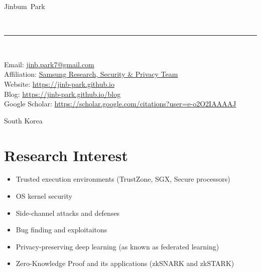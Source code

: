 \documentclass[10pt, a4paper]{article}
\makeatletter
\newcommand{\FirstName}{Jinbum}
\newcommand{\LastName}{Park}
\newcommand{\MyName}{\FirstName\ \LastName}
\newcommand{\Email}{jinb.park7@gmail.com}
\newcommand{\PersonalWebsite}{https://jinb-park.github.io}
\newcommand{\Address}{
  South Korea
}
\newcommand{\Website}[1]{\href{https://#1}{#1}}
\makeatother
\begin{document}
\thispagestyle{empty}

\begin{minipage}[t]{0.7\textwidth}
{\fontsize{22pt}{0}\selectfont\MyName}
\end{minipage}
\\[-0.1cm]
\rule{\textwidth}{2pt}
\\[0.1cm]
\begin{minipage}[t]{0.7\textwidth}
    Email: \href{mailto:\Email}{\Email}
    \\
    Affiliation: \href{https://research.samsung.com/security_privacy}{Samsung Research, Security \& Privacy Team}
    \\
    Website: \Website{\PersonalWebsite}
    \\
    Blog: \Website{https://jinb-park.github.io/blog}
    \\
    Google Scholar: \href{https://scholar.google.com/citations?user=e-o2O2IAAAAJ}{https://scholar.google.com/citations?user=e-o2O2IAAAAJ}
\end{minipage}
\begin{minipage}[t]{0.3\textwidth}
  \begin{flushright}
    \Address
  \end{flushright}
\end{minipage}

\section{Research Interest}

\begin{itemize}
  \item Trusted execution environments (TrustZone, SGX, Secure processors)
  \item OS kernel security
  \item Side-channel attacks and defenses
  \item Bug finding and exploitaitons
  \item Privacy-preserving deep learning (as known as federated learning)
  \item Zero-Knowledge Proof and its applications (zkSNARK and zkSTARK)
\end{itemize}
\end{document}
